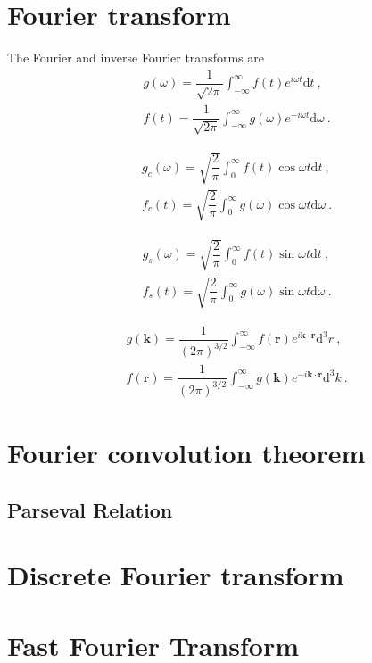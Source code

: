 \documentclass[12pt,a4paper]{article}
\renewcommand{\vec}[1]{\boldsymbol{#1}}
\newcommand{\dif}{\mathrm{d}}
\newcounter{theo}[section]\setcounter{theo}{0}
\begin{document}
\section{Fourier transform}
The Fourier and inverse Fourier transforms are
\begin{align}
& g(\omega) = \dfrac{1}{\sqrt{2\pi} } \int_{-\infty}^\infty f(t) e^{i\omega t} \dif t ~, \\
& f(t) = \dfrac{1}{\sqrt{2\pi} } \int_{-\infty}^\infty g(\omega) e^{-i\omega t} \dif \omega ~.
\end{align}

\begin{align}
& g_c(\omega) = \sqrt{\dfrac{2}{\pi} } \int_{0}^\infty f(t) \cos \omega t \dif t ~, \\
& f_c(t) = \sqrt{\dfrac{2}{\pi} } \int_{0}^\infty g(\omega) \cos \omega t \dif \omega ~.
\end{align}

\begin{align}
& g_s(\omega) = \sqrt{\dfrac{2}{\pi} } \int_{0}^\infty f(t) \sin \omega t \dif t ~, \\
& f_s(t) = \sqrt{\dfrac{2}{\pi} } \int_{0}^\infty g(\omega) \sin \omega t \dif \omega ~.
\end{align}


\begin{align}
& g(\vec{k}) = \dfrac{1}{(2\pi)^{3/2}} \int_{-\infty}^\infty f(\vec{r}) e^{i\vec{k} \cdot \vec{r} } \dif^3 r ~, \\
& f(\vec{r}) = \dfrac{1}{(2\pi)^{3/2}} \int_{-\infty}^\infty g(\vec{k}) e^{-i\vec{k} \cdot \vec{r}} \dif^3 k ~.
\end{align}

\section{Fourier convolution theorem}



\subsection{Parseval Relation}













\section{Discrete Fourier transform}










\section{Fast Fourier Transform}
\end{document}
